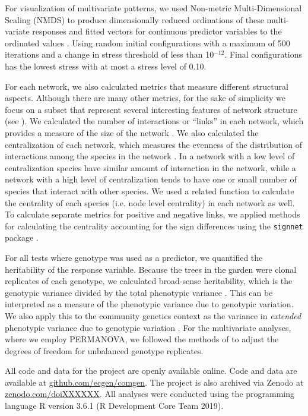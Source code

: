 \documentclass[fleqn,12pt]{olplainarticle}
\begin{document}
For visualization of multivariate patterns, we used Non-metric
Multi-Dimensional Scaling (NMDS) \cite{ecodist} to produce
dimensionally reduced ordinations of these multi-variate responses and
fitted vectors for continuous predictor variables to the ordinated
values \cite{vegan}. Using random initial configurations with a
maximum of 500 iterations and a change in stress threshold of less
than 10$^{-12}$. Final configurations has the lowest stress with at
most a stress level of 0.10.

For each network, we also calculated metrics that measure different
structural aspects. Although there are many other metrics, for the
sake of simplicity we focus on a subset that represent several
interesting features of network structure (see \citep{Lau2017a}). We
calculated the number of interactions or ``links'' in each network,
which provides a measure of the size of the network \citep{Lau2015a,
  Borrett2014EnaR:Analysis}. We also calculated the centralization of
each network, which measures the evenness of the distribution of
interactions among the species in the network \cite{sna}. In a network
with a low level of centralization species have similar amount of
interaction in the network, while a network with a high level of
centralization tends to have one or small number of species that
interact with other species. We used a related function to calculate
the centrality of each species (i.e. node level centrality) in each
network as well. To calculate separate metrics for positive and
negative links, we applied methods for calculating the centrality
accounting for the sign differences \cite{Everett2014NetworksTies}
using the \texttt{signnet} package \cite{siggnet}.

For all tests where genotype was used as a predictor, we quantified
the heritability of the response variable. Because the trees in the
garden were clonal replicates of each genotype, we calculated
broad-sense heritability, which is the genotypic variance divided by
the total phenotypic variance \cite{Conner2004ATextbook}. This can be
interpreted as a measure of the phenotypic variance due to genotypic
variation. We also apply this to the community genetics context as the
variance in \textit{extended} phenotypic variance due to genotypic
variation \cite{Whitham2006a, Whitham2012, Crutsinger2016}. For the
multivariate analyses, where we employ PERMANOVA, we followed the
methods of \citep{Shuster2006COMMUNITYSTRUCTURE} to adjust the degrees
of freedom for unbalanced genotype replicates.

All code and data for the project are openly available online. Code
and data are available at \url{github.com/ecgen/comgen}. The project
is also archived via Zenodo at \url{zenodo.com/doiXXXXXX}. All
analyses were conducted using the programming language R version 3.6.1
(R Development Core Team 2019).
\end{document}
